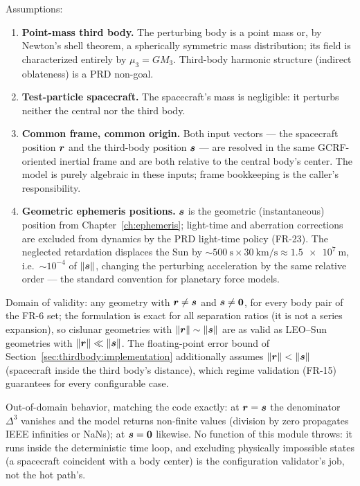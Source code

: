 Assumptions:
\begin{enumerate}
  \item \textbf{Point-mass third body.} The perturbing body is a point
    mass or, by Newton's shell theorem, a spherically symmetric mass
    distribution; its field is characterized entirely by $\mu_3 = GM_3$.
    Third-body harmonic structure (indirect oblateness) is a PRD non-goal.
  \item \textbf{Test-particle spacecraft.} The spacecraft's mass is
    negligible: it perturbs neither the central nor the third body.
  \item \textbf{Common frame, common origin.} Both input vectors --- the
    spacecraft position $\bm{r}$ and the third-body position $\bm{s}$ ---
    are resolved in the same GCRF-oriented inertial frame and are both
    relative to the central body's center. The model is purely algebraic
    in these inputs; frame bookkeeping is the caller's responsibility.
  \item \textbf{Geometric ephemeris positions.} $\bm{s}$ is the geometric
    (instantaneous) position from Chapter~\ref{ch:ephemeris}; light-time
    and aberration corrections are excluded from dynamics by the PRD
    light-time policy (FR-23). The neglected retardation displaces the Sun
    by $\sim \qty{500}{\second} \times \qty{30}{\kilo\metre\per\second}
    \approx \qty{1.5e7}{\metre}$, i.e.\ $\sim 10^{-4}$ of $\left\lVert \bm{s} \right\rVert$,
    changing the perturbing acceleration by the same relative order ---
    the standard convention for planetary force models.
\end{enumerate}

Domain of validity: any geometry with $\bm{r} \neq \bm{s}$ and
$\bm{s} \neq \bm{0}$, for every body pair of the FR-6 set; the formulation
is exact for all separation ratios (it is not a series expansion), so
cislunar geometries with $\left\lVert \bm{r} \right\rVert \sim \left\lVert \bm{s} \right\rVert$ are as valid
as LEO--Sun geometries with $\left\lVert \bm{r} \right\rVert \ll \left\lVert \bm{s} \right\rVert$. The
floating-point error bound of
Section~\ref{sec:thirdbody:implementation} additionally assumes
$\left\lVert \bm{r} \right\rVert < \left\lVert \bm{s} \right\rVert$ (spacecraft inside the third body's
distance), which regime validation (FR-15) guarantees for every
configurable case.

Out-of-domain behavior, matching the code exactly: at
$\bm{r} = \bm{s}$ the denominator $\Delta^3$ vanishes and the model
returns non-finite values (division by zero propagates IEEE infinities or
NaNs); at $\bm{s} = \bm{0}$ likewise. No function of this module throws:
it runs inside the deterministic time loop, and excluding physically
impossible states (a spacecraft coincident with a body center) is the
configuration validator's job, not the hot path's.

